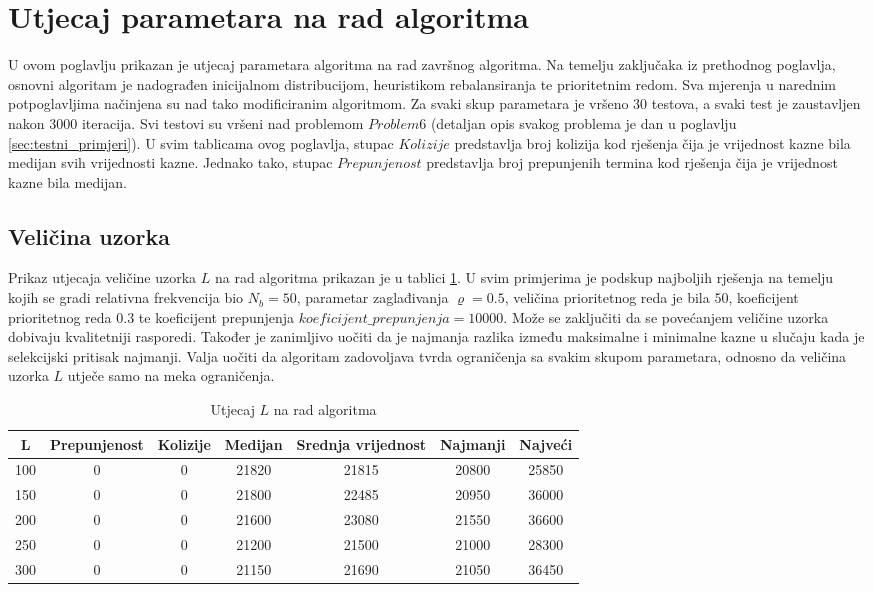 \documentclass[times, utf8, zavrsni]{fer}
\begin{document}
\section{Utjecaj parametara na rad algoritma}
U ovom poglavlju prikazan je utjecaj parametara algoritma na rad završnog algoritma. Na temelju zaključaka iz prethodnog poglavlja, osnovni algoritam je nadograđen inicijalnom
distribucijom, heuristikom rebalansiranja te prioritetnim redom. Sva mjerenja u narednim potpoglavljima načinjena su nad tako modificiranim algoritmom. Za svaki skup parametara
je vršeno $30$ testova, a svaki test je zaustavljen nakon $3000$ iteracija. Svi testovi su vršeni nad problemom $Problem 6$ (detaljan opis svakog problema je dan u poglavlju
\ref{sec:testni_primjeri}). U svim tablicama ovog poglavlja,
stupac $Kolizije$ predstavlja broj kolizija kod rješenja čija je vrijednost kazne bila medijan svih vrijednosti kazne.
Jednako tako, stupac $Prepunjenost$ predstavlja broj prepunjenih termina kod rješenja čija je vrijednost kazne bila medijan.

\subsection{Veličina uzorka}
Prikaz utjecaja veličine uzorka $L$ na rad algoritma prikazan je u tablici \ref{tbl:utjecaj_l}.
U svim primjerima je podskup najboljih rješenja na temelju kojih se gradi relativna frekvencija bio $N_b = 50$, parametar zaglađivanja $\varrho = 0.5$, veličina prioritetnog reda
je bila $50$, koeficijent prioritetnog reda $0.3$ te koeficijent prepunjenja $koeficijent\_prepunjenja = 10000$. Može se zaključiti da se povećanjem veličine uzorka dobivaju
kvalitetniji rasporedi. Također je zanimljivo uočiti da je najmanja razlika između maksimalne i minimalne kazne u slučaju kada je selekcijski pritisak najmanji. Valja uočiti da
algoritam zadovoljava tvrda ograničenja sa svakim skupom parametara, odnosno da veličina uzorka $L$ utječe samo na meka ograničenja.

\begin{table}
  \caption{Utjecaj $L$ na rad algoritma}
  \label{tbl:utjecaj_l}
  \centering
  \begin{tabular}{c | c | c | c | c | c | c  }
    L &  Prepunjenost & Kolizije & Medijan & Srednja vrijednost & Najmanji & Najveći \\ \hline
    100 & 0 & 0 & 21820 & 21815 & 20800 & 25850 \\ \hline
    150 & 0 & 0 & 21800 & 22485 & 20950 & 36000 \\ \hline
    200 & 0 & 0 & 21600 & 23080 & 21550 & 36600 \\ \hline
    250 & 0 & 0 & 21200 & 21500 & 21000 & 28300 \\ \hline
    300 & 0 & 0 & 21150 & 21690 & 21050 & 36450
  \end{tabular}
\end{table}
\end{document}
